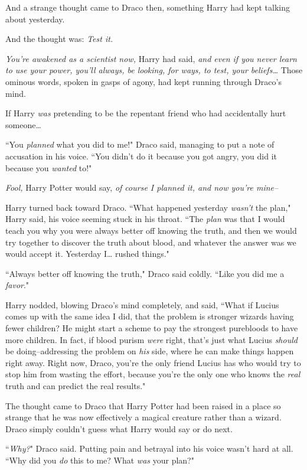 And a strange thought came to Draco then, something Harry had kept talking about yesterday.

And the thought was: \emph{Test it.}

\emph{You're awakened as a scientist now,} Harry had said, \emph{and even if you never learn to use your power, you'll always, be looking, for ways, to test, your beliefs{\ldots}} Those ominous words, spoken in gasps of agony, had kept running through Draco's mind.

If Harry \emph{was} pretending to be the repentant friend who had accidentally hurt someone{\ldots}

``You \emph{planned} what you did to me!" Draco said, managing to put a note of accusation in his voice. ``You didn't do it because you got angry, you did it because you \emph{wanted} to!"

\emph{Fool,} Harry Potter would say, \emph{of course I planned it, and now you're mine\---}

Harry turned back toward Draco. ``What happened yesterday \emph{wasn't} the plan," Harry said, his voice seeming stuck in his throat. ``The \emph{plan} was that I would teach you why you were always better off knowing the truth, and then we would try together to discover the truth about blood, and whatever the answer was we would accept it. Yesterday I{\ldots} rushed things."

``Always better off knowing the truth," Draco said coldly. ``Like you did me a \emph{favor}."

Harry nodded, blowing Draco's mind completely, and said, ``What if Lucius comes up with the same idea I did, that the problem is stronger wizards having fewer children? He might start a scheme to pay the strongest purebloods to have more children. In fact, if blood purism \emph{were} right, that's just what Lucius \emph{should} be doing\---addressing the problem on \emph{his} side, where he can make things happen right away. Right now, Draco, you're the only friend Lucius has who would try to stop him from wasting the effort, because you're the only one who knows the \emph{real} truth and can predict the real results."

The thought came to Draco that Harry Potter had been raised in a place so strange that he was now effectively a magical creature rather than a wizard. Draco simply couldn't guess what Harry would say or do next.

``\emph{Why?}" Draco said. Putting pain and betrayal into his voice wasn't hard at all. ``Why did you \emph{do} this to me? What \emph{was} your plan?"

